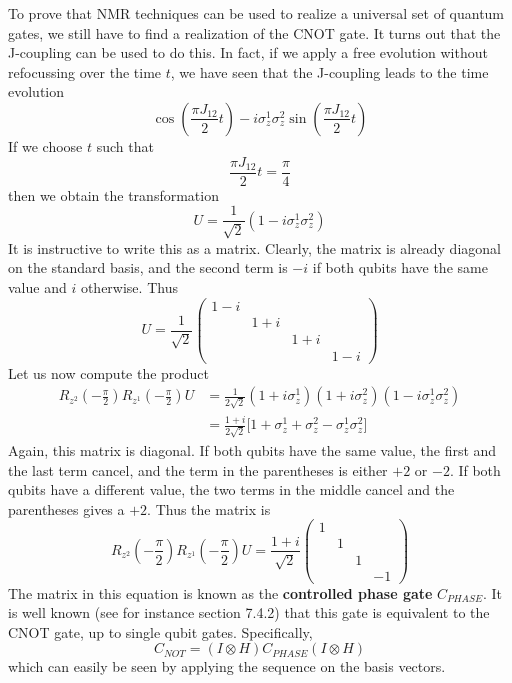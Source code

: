 \documentclass[a4paper, draft]{article}
\theoremstyle{own}
\theoremstyle{remark}
\begin{document}
To prove that NMR techniques can be used to realize a universal set of quantum gates, we still have to find a realization of the CNOT gate. It turns out that the J-coupling can be used to do this. In fact, if we apply a free evolution without refocussing over the time $t$, we have seen that the J-coupling leads to the time evolution
$$
\cos (\frac{\pi J_{12}}{2} t) -i \sigma_z^1 \sigma_z^2 \sin (\frac{\pi J_{12}}{2}  t)
$$
If we choose $t$ such that
$$
\frac{\pi J_{12}}{2} t = \frac{\pi}{4} 
$$
then we obtain the transformation
$$
U = \frac{1}{\sqrt{2}} (1 -i \sigma_z^1 \sigma_z^2) 
$$
It is instructive to write this as a matrix. Clearly, the matrix is already diagonal on the standard basis, and the second term is $-i$ if both qubits have the same value and $i$ otherwise. Thus
$$
U = \frac{1}{\sqrt{2}} 
\begin{pmatrix}
1 - i & & & \\
& 1 + i & &  \\
& & 1 + i & \\
& & & 1 - i
\end{pmatrix}
$$
Let us now compute the product
\begin{align*}
R_{z^2}(-\frac{\pi}{2}) R_{z^1}(-\frac{\pi}{2}) U  &= \frac{1}{2\sqrt{2}} (1 + i \sigma^1_z) (1 + i \sigma^2_z) (1 -i \sigma_z^1 \sigma_z^2) 
 \\
&= \frac{1+i}{2\sqrt{2}} \big[ 1 +  \sigma_z^1 + \sigma_z^2 - \sigma_z^1 \sigma_z^2 \big] 
\end{align*}
Again, this matrix is diagonal. If both qubits have the same value, the first and the last term cancel, and the term in the parentheses is either $+2$ or $-2$. If both qubits have a different value, the two terms in the middle cancel and the parentheses gives a $+2$. Thus the matrix is
$$
R_{z^2}(-\frac{\pi}{2}) R_{z^1}(-\frac{\pi}{2}) U =  \frac{1+i}{\sqrt{2}}
\begin{pmatrix}
1 & & & \\
& 1 & & \\
& & 1 & \\
& & & -1 
\end{pmatrix}
$$
The matrix in this equation is known as the {\bf controlled phase gate} $C_{PHASE}$. It is well known (see for instance \cite{NielsenChuang} section 7.4.2) that this gate is equivalent to the CNOT gate, up to single qubit gates. Specifically,
$$
C_{NOT} = (I \otimes H) C_{PHASE} (I \otimes H)
$$
which can easily be seen by applying the sequence on the basis vectors. 
\end{document}
